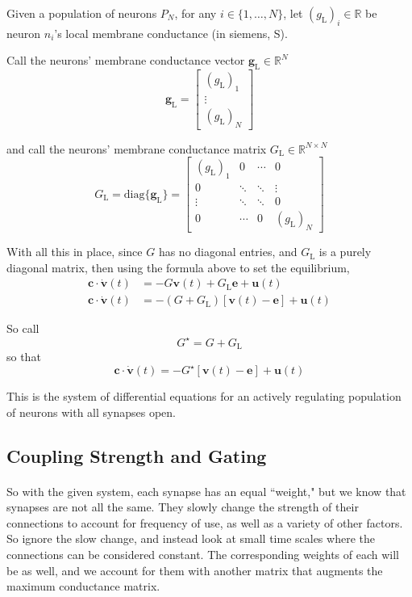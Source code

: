 \documentclass{article}
\begin{document}
\begin{definition}[$G_{\text{L}} = \textbf{local membrane conductance matrix}$]\label{c}
Given a population of neurons $P_{N}$, for any $i \in \{ 1, \dots, N \}$, let $(g_{\text{L}})_{i}\in\mathbb{R}$ be neuron $n_{i}$'s local membrane conductance (in siemens, S).

Call the neurons' membrane conductance vector $\mathbf{g}_{\text{L}}\in\mathbb{R}^{N}$
\[ \mathbf{g}_{\text{L}} =
\begin{bmatrix}
(g_{\text{L}})_{1} \\
\vdots \\
(g_{\text{L}})_{N}
\end{bmatrix} \]

and call the neurons' membrane conductance matrix $G_{\text{L}}\in\mathbb{R}^{N\times N}$
\[ G_{\text{L}} = \text{diag}\{ \mathbf{g}_{\text{L}} \} =
\begin{bmatrix}
(g_{\text{L}})_{1} & 0 & \cdots & 0 \\
0 & \ddots & \ddots & \vdots \\
\vdots & \ddots & \ddots & 0 \\
0 & \cdots & 0 & (g_{\text{L}})_{N}
\end{bmatrix} \]
\end{definition}

With all this in place, since $G$ has no diagonal entries, and $G_{\text{L}}$ is a purely diagonal matrix, then using the formula above to set the equilibrium,
\begin{align*}
\mathbf{c}\cdot\dot{\mathbf{v}}(t) &=  -G \mathbf{v}(t) + G_{\text{L}} \mathbf{e} + \mathbf{u}(t) \\
\mathbf{c}\cdot\dot{\mathbf{v}}(t) &= -\left( G + G_{\text{L}} \right) \left[ \mathbf{v}(t) - \mathbf{e} \right] + \mathbf{u}(t)
\end{align*}

So call 
\[ \boxed{ G^{\star} = G + G_{\text{L}} } \]
so that 
\[ \boxed{ \mathbf{c}\cdot\dot{\mathbf{v}}(t) = -G^{\star} \left[ \mathbf{v}(t) - \mathbf{e} \right] + \mathbf{u}(t) } \]

This is the system of differential equations for an actively regulating population of neurons with all synapses open.

\subsection{Coupling Strength and Gating}

\paragraph{}
So with the given system, each synapse has an equal ``weight," but we know that synapses are not all the same. They slowly change the strength of their connections to account for frequency of use, as well as a variety of other factors. So ignore the slow change, and instead look at small time scales where the connections can be considered constant. The corresponding weights of each will be as well, and we account for them with another matrix that augments the maximum conductance matrix.
\end{document}
